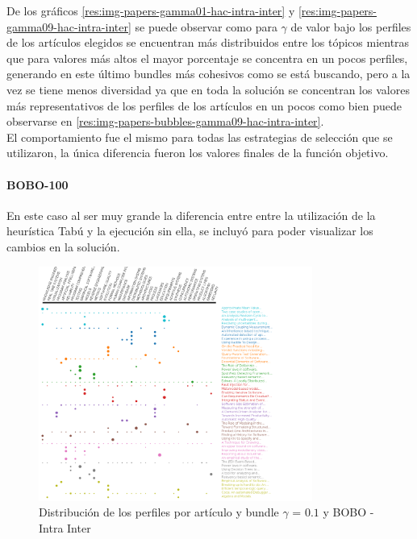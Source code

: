 De los gráficos \ref{res:img-papers-gamma01-hac-intra-inter} y \ref{res:img-papers-gamma09-hac-intra-inter} se puede observar como para $\gamma$ de valor bajo los perfiles de los artículos elegidos se encuentran más distribuidos entre los tópicos mientras que para valores más altos el mayor porcentaje se concentra en un pocos perfiles, generando en este último bundles más cohesivos como se está buscando, pero a la vez se tiene menos diversidad ya que en toda la solución se concentran los valores más representativos de los perfiles de los artículos en un pocos como bien puede observarse en \ref{res:img-papers-bubbles-gamma09-hac-intra-inter}.\\
El comportamiento fue el mismo para todas las estrategias de selección que se utilizaron, la única diferencia fueron los valores finales de la función objetivo.
\paragraph{BOBO-100}
En este caso al ser muy grande la diferencia entre entre la utilización de la heurística Tabú y la ejecución sin ella,  se incluyó para poder visualizar los cambios en la solución.
\begin{figure}[H]
  \centering
    \includegraphics[width=0.8\textwidth]{resultados/papers/BOBO/INTRA_INTER/gamma-01.png}
  \caption{Distribución de los perfiles por artículo y bundle $\gamma$ = $0.1$ y BOBO - Intra Inter}
  \label{res:img-papers-gamma01-bobo-intra-inter}
\end{figure}


